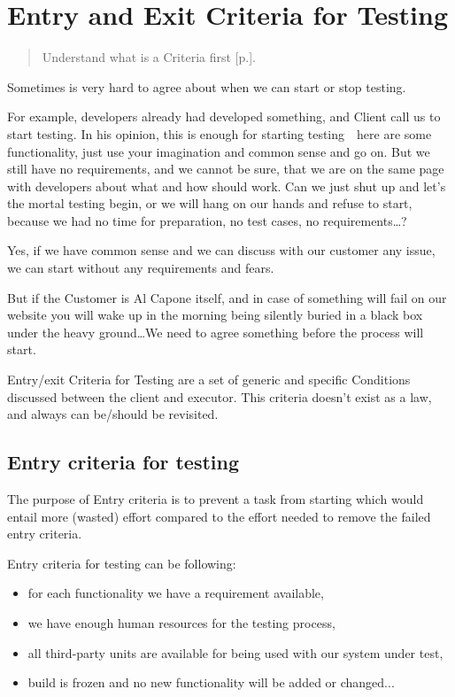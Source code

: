 \section{Entry and Exit Criteria for Testing}
\label{sec:Entry and Exit Criteria for Testing}

\begin{quote}
Understand what is a Criteria first [p.\pageref{sec:Criteria}].
\end{quote} 

Sometimes is very hard to agree about when we can start or stop testing.

For example, developers already had developed something, and Client call us to start testing. In his opinion, this is enough for starting testing~\textemdash~here are some functionality, just use your imagination and common sense and go on. But we still have no requirements, and we cannot be sure, that we are on the same page with developers about what and how should work. Can we just shut up and let's the mortal testing begin, or we will hang on our hands and refuse to start, because we had no time for preparation, no test cases, no requirements\ldots?

Yes, if we have common sense and we can discuss with our customer any issue, we can start without any requirements and fears.

But if the Customer is Al Capone itself, and in case of something will fail on our website you will wake up in the morning being silently buried in a black box under the heavy ground\ldots We need to agree something before the process will start.

Entry/exit Criteria for Testing are a set of generic and specific Conditions discussed between the client and executor. This criteria doesn't exist as a law, and always can be/should be revisited.

\subsection{Entry criteria for testing}
\label{sec:Entry criteria for testing}

The purpose of Entry criteria is to prevent a task from starting which would entail more (wasted) effort compared to the effort needed to remove the failed entry criteria.

Entry criteria for testing can be following:

    \begin{itemize}
\item 
for each functionality we have a requirement available,
\item 
    we have enough human resources for the testing process,
\item 
    all third-party units are available for being used with our system under test,
\item 
    build is frozen and no new functionality will be added or changed...                                                                        \end{itemize}


